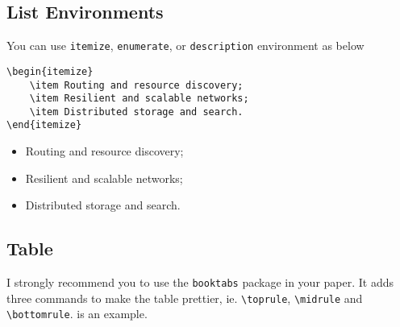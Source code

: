 \documentclass[11pt]{elegantpaper}
\begin{document}
\subsection{List Environments}
You can use \lstinline{itemize}, \lstinline{enumerate}, or \lstinline{description} environment as below\\
\begin{minipage}[c]{0.51\linewidth}
\begin{lstlisting}
\begin{itemize}
    \item Routing and resource discovery;
    \item Resilient and scalable networks;
    \item Distributed storage and search.
\end{itemize}
\end{lstlisting}
\end{minipage}
\begin{minipage}[c]{0.48\linewidth}
\begin{itemize}
    \item Routing and resource discovery;
    \item Resilient and scalable networks;
    \item Distributed storage and search.
\end{itemize}
\end{minipage}

\subsection{Table}
I strongly recommend you to use the \lstinline{booktabs} package in your paper. It adds three commands to make the table prettier, ie. \lstinline{\toprule}, \lstinline{\midrule} and \lstinline{\bottomrule}.  is an example.
\end{document}
